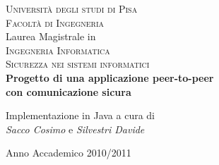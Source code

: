 



\begin{titlepage}
 \begin{center}
     \vspace{1em}
     {\Large \textsc{Università degli studi di Pisa}}\\
     \vspace{1em}
     {\Large \textsc{Facoltà di Ingegneria}}\\
     \vspace{2em}
     {\normalsize Laurea Magistrale in}\\
     \vspace{1em}
     {\Large \textsc{Ingegneria Informatica}}\\
     \vspace{2em}
     {\Large \textsc{Sicurezza nei sistemi informatici}}\\
     \vspace{2em}
     {\LARGE \textbf{Progetto di una applicazione peer-to-peer}}\\
     \vspace{1em}
     {\LARGE \textbf{con comunicazione sicura}}
 \end{center}

\vskip 2cm
  \begin{center}
      Implementazione in Java
      \vskip 1cm
      a cura di\\
      \emph{Sacco Cosimo} e \emph{Silvestri Davide}
  \end{center}

\vskip 1cm
\begin{center}
{\normalsize Anno Accademico 2010/2011}
\end{center}
\end{titlepage}
\clearpage{\pagestyle{empty}\cleardoublepage}
